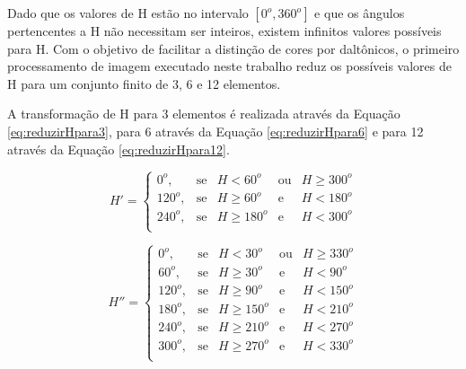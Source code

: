 \documentclass[	12pt, Times, openright, twoside, a4paper, english, brazil]{abntex2}
\begin{document}
Dado que os valores de H estão no intervalo $[0^o, 360^o]$ e que os ângulos pertencentes a H não necessitam ser inteiros, existem infinitos valores possíveis para H. Com o objetivo de facilitar a distinção de cores por daltônicos, o primeiro processamento de imagem executado neste trabalho reduz os possíveis valores de H para um conjunto finito de 3, 6 e 12 elementos.

A transformação de H para 3 elementos é realizada através da Equação \ref{eq:reduzirHpara3}, para 6 através da Equação \ref{eq:reduzirHpara6} e para 12 através da Equação \ref{eq:reduzirHpara12}. 

\begin{equation}
\label{eq:reduzirHpara3}
H'=\left\{
\begin{array}{rclcl}
    0^o,    &\mbox{se}  & H <60^o       & \mbox{ou} & H \geq 300^o  \\
    120^o,  &\mbox{se}  & H \geq 60^o   & \mbox{e}  & H < 180^o     \\
    240^o,  &\mbox{se}  & H \geq 180^o  & \mbox{e}  & H < 300^o     \\
\end{array}\right.
\end{equation}

\begin{equation}
\label{eq:reduzirHpara6}
H''=\left\{
\begin{array}{rclcl}
    0^o,    &\mbox{se}  & H <30^o       & \mbox{ou} & H \geq 330^o  \\
    60^o,   &\mbox{se}  & H \geq 30^o   & \mbox{e}  & H < 90^o      \\
    120^o,  &\mbox{se}  & H \geq 90^o   & \mbox{e}  & H < 150^o     \\
    180^o,  &\mbox{se}  & H \geq 150^o  & \mbox{e}  & H < 210^o     \\
    240^o,  &\mbox{se}  & H \geq 210^o  & \mbox{e}  & H < 270^o     \\
    300^o,  &\mbox{se}  & H \geq 270^o  & \mbox{e}  & H < 330^o     \\
\end{array}\right.
\end{equation}
\end{document}
